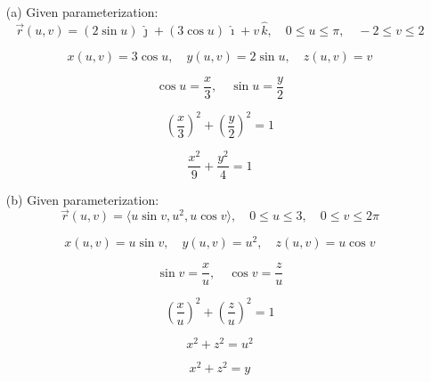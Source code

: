 \documentclass{report}
\begin{document}
\begin{enumerate}

    \item[(a)] Given parameterization:
    \[
    \vec{r}(u, v) = (2 \sin u) \, \hat{\jmath} + (3 \cos u) \, \hat{\imath} + v \, \hat{k}, \quad 0 \leq u \leq \pi, \quad -2 \leq v \leq 2
    \]

    \[ x(u, v) = 3 \cos u, \quad y(u, v) = 2 \sin u, \quad z(u, v) = v \]

    \[ \cos u = \frac{x}{3}, \quad \sin u = \frac{y}{2} \]

    \[ \left( \frac{x}{3} \right)^2 + \left( \frac{y}{2} \right)^2 = 1 \]

    \[ \frac{x^2}{9} + \frac{y^2}{4} = 1 \]

    \begin{center}
    \end{center}

    \item[(b)] Given parameterization:
    \[ \vec{r}(u, v) = \langle u \sin v, u^2, u \cos v \rangle, \quad 0 \leq u \leq 3, \quad 0 \leq v \leq 2\pi \]

    \[ x(u, v) = u \sin v, \quad y(u, v) = u^2, \quad z(u, v) = u \cos v \]

    \[  \sin v = \frac{x}{u}, \quad \cos v = \frac{z}{u} \]

    \[ \left( \frac{x}{u} \right)^2 + \left( \frac{z}{u} \right)^2 = 1 \]

    \[ x^2 + z^2 = u^2 \]

    \[ x^2 + z^2 = y \]


\end{enumerate}
\end{document}
